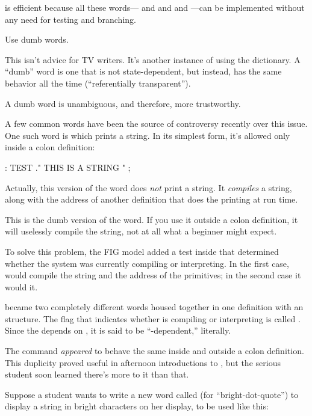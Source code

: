 \Forth{} is efficient because all these words--- and  and
\forth{+} and ---can be implemented without any need for testing and
branching.
%
\begin{tip}
Use dumb words.
\end{tip}
This isn't advice for TV writers. It's another instance of using the
dictionary. A ``dumb'' word is one that is not state-dependent, but
instead, has the same behavior all the time (``referentially transparent'').

A dumb word is unambiguous, and therefore, more trustworthy.

A few common \Forth{} words have been the source of controversy
recently over this issue. One such word is  which prints a string.
In its simplest form, it's allowed only inside a colon definition:

\begin{Code}
: TEST   ." THIS IS A STRING " ;
\end{Code}
Actually, this version of the word does \emph{not} print a string. It
\emph{compiles} a string, along with the address of another definition
that does the printing at run time.

This is the dumb version of the word. If you use it outside a colon
definition, it will uselessly compile the string, not at all what a beginner
might expect.

To solve this problem, the FIG model added a test inside  that
determined whether the system was currently compiling or interpreting.
In the first case,  would compile the string and the address of the
primitives; in the second case it would  it.

 became two completely different words housed together in one
definition with an  structure. The flag that indicates
whether \Forth{} is compiling or interpreting is called . Since the
 depends on , it is said to be ``-dependent,''
literally.

The command \emph{appeared} to behave the same inside and outside a
colon definition. This duplicity proved useful in afternoon introductions
to \Forth{}, but the serious student soon learned there's more to it than
that.

Suppose a student wants to write a new word called  (for
``bright-dot-quote'') to display a string in bright characters on her
display, to be used like this:

